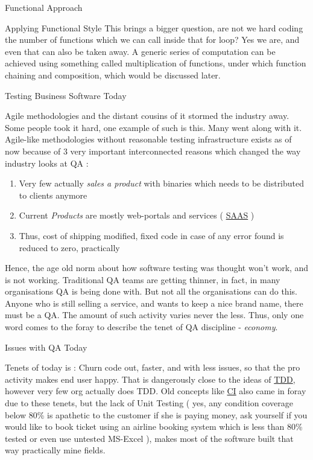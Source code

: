 \begin{section}{Functional Approach}
\begin{subsection}{Applying Functional Style}
This brings a bigger question, are not we hard coding the number of functions which we can call inside that for loop? Yes we are, and even that can also be taken away.  A generic series of computation can be achieved using something called multiplication of functions, under which function chaining and composition, which would be discussed later. 

\end{subsection}
\end{section}

\begin{section}{Testing Business Software Today}\label{practical-testing}

Agile methodologies and the distant cousins of it stormed the industry away. Some people took it hard, one example of such is this. Many went along with it. Agile-like methodologies without reasonable testing infrastructure exists as of now because of 3 very important interconnected reasons which changed the way industry looks at QA :

\begin{enumerate}
\item{ Very few actually \emph{sales a product} with binaries which needs to be distributed to clients anymore}
\item{ Current \emph{Products} are mostly web-portals and services ( \href{https://en.wikipedia.org/wiki/Software_as_a_service}{SAAS} ) } 
\item{Thus, cost of shipping modified, fixed code in case of any error found is reduced to zero, practically}
\end{enumerate}


Hence, the age old norm about how software testing was thought won't work, and is not working. Traditional QA teams are getting thinner, in fact, in many organisations QA is being done with. But not all the organisations can do this. Anyone who is still selling a service, and wants to keep a nice brand name,  there must be a QA. The amount of such activity  varies never the less. Thus, only one word comes to the foray to describe the tenet of QA discipline  - \emph{economy}.

\begin{subsection}{Issues with QA Today}

Tenets of today is : Churn code out, faster, and with less issues, so that the pro activity makes end user happy. That is dangerously close to the ideas of \href{https://en.wikipedia.org/wiki/Test-driven_development}{TDD}, however very few org actually does TDD. Old concepts like \href{https://en.wikipedia.org/wiki/Continuous_integration}{CI}  also came in foray due to these tenets, but the lack of Unit Testing ( yes, any condition coverage below 80\% is apathetic to the customer if she is paying money, ask yourself if you would like to book ticket using an airline booking system which is less than 80\% tested or even use untested MS-Excel ), makes most of the software built that way practically mine fields.


\end{subsection}
\end{section}
